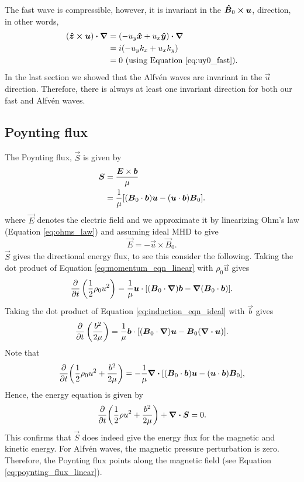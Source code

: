 The fast wave is compressible, however, it is invariant in the $\boldsymbol{\hat{B}}_0\cross\boldsymbol{u}$, direction, in other words,
\begin{equation}
\begin{aligned}
    (\vec{\hat{z}}\cross \vec{u})\vdot\grad &= (-u_y \vec{\hat{x}} + u_x \vec{\hat{y}})\vdot\grad \\
    &= i(-u_yk_x + u_xk_y) \\
    &= 0\ \text{(using Equation \eqref{eq:uy0_fast}).}
\end{aligned}
\end{equation}
In the last section we showed that the Alfv\'en waves are invariant in the $\vec{u}$ direction. Therefore, there is always at least one invariant direction for both our fast and Alfv\'en waves.

\subsection{Poynting flux}

The Poynting flux, $\vec{S}$ is given by
\begin{equation}
    \label{eq:poynting_flux_linear}
    \begin{aligned}
    \boldsymbol{S}&=\frac{\boldsymbol{E}\times\boldsymbol{b}}{\mu} \\
    & = \frac{1}{\mu}\qty[(\boldsymbol{B}_0\cdot\boldsymbol{b})\boldsymbol{u}-(\boldsymbol{u}\cdot\boldsymbol{b})\boldsymbol{B}_0].
    \end{aligned}
\end{equation}
where $\vec{E}$ denotes the electric field and we approximate it by linearizing Ohm's law (Equation \eqref{eq:ohms_law}) and assuming ideal MHD to give
\begin{equation}
    \label{eq:ideal_linear_ohms_law}
    \vec{E}=-\vec{u}\times\vec{B}_0.
\end{equation}
$\vec{S}$ gives the directional energy flux, to see this consider the following.
Taking the dot product of Equation \eqref{eq:momentum_eqn_linear} with $\rho_0 \vec{u}$ gives
\[\pdv{}{t}\left(\frac{1}{2}\rho_0 u^2\right)=\frac{1}{\mu}\boldsymbol{u}\cdot\qty[(\boldsymbol{B}_0\cdot\boldsymbol{\nabla})\boldsymbol{b}-\boldsymbol{\nabla}(\boldsymbol{B}_0\cdot\boldsymbol{b})].\]
Taking the dot product of Equation \eqref{eq:induction_eqn_ideal} with $\vec{b}$ gives
\[\pdv{}{t}\left(\frac{b^2}{2\mu}\right)=\frac{1}{\mu}\boldsymbol{b}\cdot\qty[(\boldsymbol{B}_0\cdot\boldsymbol{\nabla})\boldsymbol{u}-\boldsymbol{B}_0(\div\boldsymbol{u})].\]
Note that
\[\pdv{}{t}\qty(\frac{1}{2}\rho_0 u^2 + \frac{b^2}{2\mu})=-\frac{1}{\mu}\div\qty[(\boldsymbol{B}_0\cdot\boldsymbol{b})\boldsymbol{u} - (\boldsymbol{u}\cdot\boldsymbol{b})\boldsymbol{B}_0],\]
Hence, the energy equation is given by
\begin{equation}
    \label{eq:total_energy_eqn_linear}
    \pdv{}{t}\qty(\frac{1}{2}\rho u^2+\frac{b^2}{2\mu}) + \div{\boldsymbol{S}}=0.
\end{equation}
This confirms that $\vec{S}$ does indeed give the energy flux for the magnetic and kinetic energy. For Alfv\'en waves, the magnetic pressure perturbation is zero. Therefore, the Poynting flux points along the magnetic field (see Equation \eqref{eq:poynting_flux_linear}).



